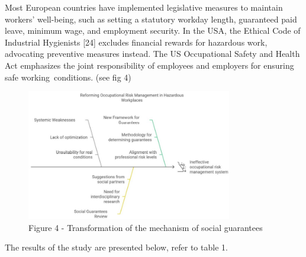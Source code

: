 \begin{multicols}{2}
Most European countries have implemented legislative measures to
maintain workers'{} well-being, such as setting a
statutory workday length, guaranteed paid leave, minimum wage, and
employment security. In the USA, the Ethical Code of Industrial
Hygienists {[}24{]} excludes financial rewards for hazardous work,
advocating preventive measures instead. The US Occupational Safety and
Health Act emphasizes the joint responsibility of employees and
employers for ensuring safe working~conditions. (see fig 4)
\end{multicols}

\begin{figure}[H]
	\centering
	\includegraphics[width=0.8\textwidth]{media/gorn/image5}
	\caption*{Figure 4 - Transformation of the mechanism of social guarantees}
\end{figure}

The results of the study are presented below, refer to table 1.

